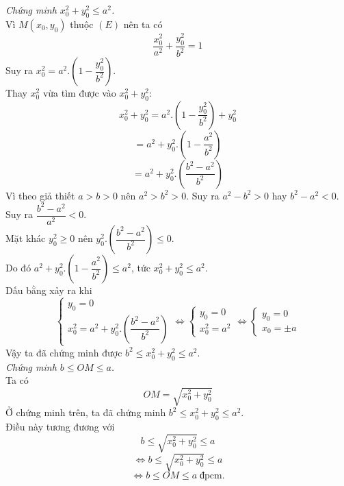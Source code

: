 \begin{bt}
{\begin{enumerate}[a)]
\textit{Chứng minh $x_0^2+y_0^2 \leq a^2$.}\\
Vì $M\left(x_{0}, y_{0}\right)$ thuộc $(E)$ nên ta có
$$\dfrac{x_0^{2}}{a^{2}}+\dfrac{y_0^{2}}{b^{2}}=1 $$
Suy ra $x_0^2=a^2.\left( 1- \dfrac{y_0^{2}}{b^{2}} \right) $.\\
Thay $x_0^2$ vừa tìm được vào $x_{0}^{2}+y_{0}^{2}$:
$$x_{0}^{2}+y_{0}^{2}=a^2.\left( 1- \dfrac{y_0^{2}}{b^{2}} \right) + y_{0}^{2} $$
$$ =a^2 +y_0^2.\left( 1 - \dfrac{a^2}{b^2}\right)  $$
$$ =a^2 +y_0^2.\left( \dfrac{b^2-a^2}{b^2}\right) $$
Vì theo giả thiết $a>b>0$ nên $a^2>b^2>0$. Suy ra $a^2-b^2 >0$ hay $b^2-a^2 <0$. \\
Suy ra $\dfrac{b^2-a^2}{a^2} <0$.\\
Mặt khác $y_0^2 \geq 0$ nên $y_0^2.\left( \dfrac{b^2-a^2}{b^2}\right) \leq 0$.\\
Do đó $a^2 +y_0^2.\left( 1 - \dfrac{a^2}{b^2}\right) \leq a^2$, tức $x_{0}^{2}+y_{0}^{2} \leq a^2.$\\
Dấu bằng xảy ra khi \[\left\{ {\begin{array}{*{20}{c}}
  {{y_0} = 0} \\
  {x_0^2 = a^2 +y_0^2.\left( \dfrac{b^2-a^2}{b^2}\right)}
\end{array}} \right. \Leftrightarrow \left\{ {\begin{array}{*{20}{c}}
  {{y_0} = 0} \\
  {x_0^2 = {a^2}}
\end{array}} \right. \Leftrightarrow \left\{ {\begin{array}{*{20}{c}}
  {{y_0} = 0} \\
  {{x_0} =  \pm a}
\end{array}} \right.\]
Vậy ta đã chứng minh được $b^{2} \leq x_{0}^{2}+y_{0}^{2} \leq a^{2}$.\\
\textit{Chứng minh $b \leq O M \leq a$.}\\
Ta có
\[OM=\sqrt{x_0^2+y_0^2}\]
Ở chứng minh trên, ta đã chứng minh
$b^{2} \leq x_{0}^{2}+y_{0}^{2} \leq a^{2}$.\\
Điều này tương đương với
\[b \leq \sqrt{x_0^2+y_0^2} \leq a\]
\[\Leftrightarrow b \leq \sqrt{x_0^2+y_0^2} \leq a\]
\[\Leftrightarrow b \leq OM \leq a \; \text{đpcm.}\]
\end{enumerate}
}
\end{bt}


